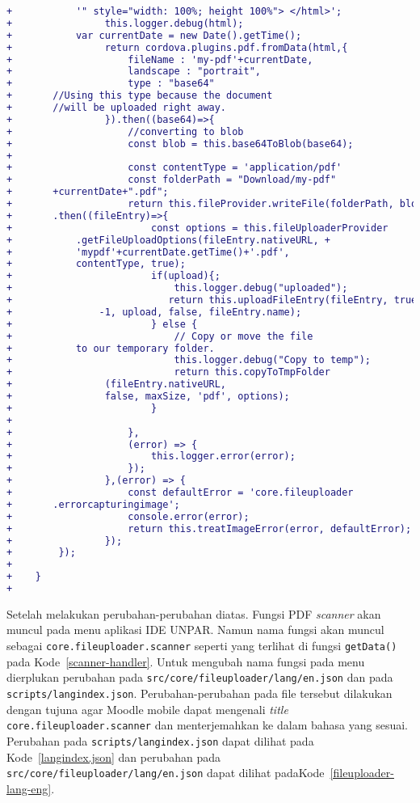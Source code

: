 \begin{lstlisting}[language=diff, frame=single, label ={fileuploader-helper}, caption = Perubahan pada \texttt{src/core/fileuploader/providers/helper.ts} ]
+	        '" style="width: 100%; height 100%"> </html>';
+                this.logger.debug(html);
+ 	        var currentDate = new Date().getTime();
+                return cordova.plugins.pdf.fromData(html,{
+                    fileName : 'my-pdf'+currentDate,
+                    landscape : "portrait",
+                    type : "base64" 
+		//Using this type because the document 
+		//will be uploaded right away.
+                }).then((base64)=>{   
+                    //converting to blob
+                    const blob = this.base64ToBlob(base64);
+                    
+                    const contentType = 'application/pdf'
+                    const folderPath = "Download/my-pdf"
+ 		+currentDate+".pdf";
+                    return this.fileProvider.writeFile(folderPath, blob)
+		.then((fileEntry)=>{
+                        const options = this.fileUploaderProvider
+			.getFileUploadOptions(fileEntry.nativeURL, +	
+			'mypdf'+currentDate.getTime()+'.pdf',  
+			contentType, true);
+                        if(upload){;
+                            this.logger.debug("uploaded");
+                           return this.uploadFileEntry(fileEntry, true, 
+ 		        -1, upload, false, fileEntry.name);
+                        } else {
+                            // Copy or move the file 
+			to our temporary folder.
+                            this.logger.debug("Copy to temp");
+                            return this.copyToTmpFolder
+ 		         (fileEntry.nativeURL, 
+ 		         false, maxSize, 'pdf', options);
+                        }
+                    
+                    },
+                    (error) => {
+                        this.logger.error(error);
+                    });
+                },(error) => {
+                    const defaultError = 'core.fileuploader
+		.errorcapturingimage';
+                    console.error(error);
+                    return this.treatImageError(error, defaultError);
+                });
+        });
+    
+    }
+
\end{lstlisting}


Setelah melakukan perubahan-perubahan diatas. Fungsi PDF \textit{scanner} akan muncul pada menu aplikasi IDE UNPAR. Namun nama fungsi akan muncul sebagai \texttt{core.fileuploader.scanner} seperti yang terlihat di fungsi \texttt{getData()} pada \mbox{Kode \ref{scanner-handler}}. Untuk mengubah nama fungsi pada menu dierplukan perubahan pada \texttt{src/core/fileuploader/lang/en.json} dan pada \texttt{scripts/langindex.json}. Perubahan-perubahan pada file tersebut dilakukan dengan tujuna agar Moodle mobile dapat mengenali \textit{title} \texttt{core.fileuploader.scanner} dan menterjemahkan ke dalam bahasa yang sesuai.  Perubahan pada \texttt{scripts/langindex.json} dapat dilihat pada \mbox{Kode \ref{langindex.json}} dan perubahan pada \texttt{src/core/fileuploader/lang/en.json} dapat dilihat pada\mbox{Kode \ref{fileuploader-lang-eng}}.

